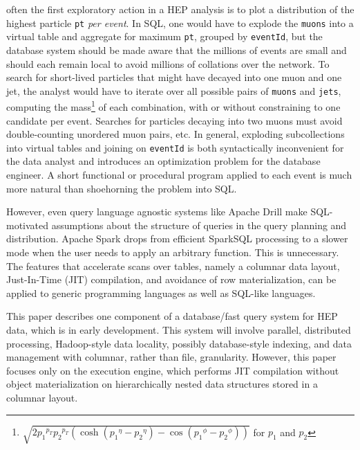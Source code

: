 \documentclass[10pt, conference, compsocconf]{IEEEtran}
\begin{document}
\vspace{0.15 cm}
\noindent often the first exploratory action in a HEP analysis is to plot a distribution of the highest particle {\tt pt} {\it per event}. In SQL, one would have to explode the {\tt muons} into a virtual table and aggregate for maximum {\tt pt}, grouped by {\tt eventId}, but the database system should be made aware that the millions of events are small and should each remain local to avoid millions of collations over the network. To search for short-lived particles that might have decayed into one muon and one jet, the analyst would have to iterate over all possible pairs of {\tt muons} and {\tt jets}, computing the mass\footnote{$\sqrt{2 {p_1}^{p_T} {p_2}^{p_T} (\cosh({p_1}^\eta - {p_2}^\eta) - \cos({p_1}^\phi - {p_2}^\phi))}$ for $p_1$ and $p_2$} of each combination, with or without constraining to one candidate per event. Searches for particles decaying into two muons must avoid double-counting unordered muon pairs, etc. In general, exploding subcollections into virtual tables and joining on {\tt eventId} is both syntactically inconvenient for the data analyst and introduces an optimization problem for the database engineer. A short functional or procedural program applied to each event is much more natural than shoehorning the problem into SQL.

However, even query language agnostic systems like Apache Drill\cite{drill} make SQL-motivated assumptions about the structure of queries in the query planning and distribution. Apache Spark\cite{spark} drops from efficient SparkSQL\cite{sparksql} processing to a slower mode when the user needs to apply an arbitrary function. This is unnecessary. The features that accelerate scans over tables, namely a columnar data layout, Just-In-Time (JIT) compilation, and avoidance of row materialization, can be applied to generic programming languages as well as SQL-like languages.

This paper describes one component of a database/fast query system for HEP data, which is in early development. This system will involve parallel, distributed processing, Hadoop-style data locality, possibly database-style indexing, and data management with columnar, rather than file, granularity. However, this paper focuses only on the execution engine, which performs JIT compilation without object materialization on hierarchically nested data structures stored in a columnar layout.
\end{document}
